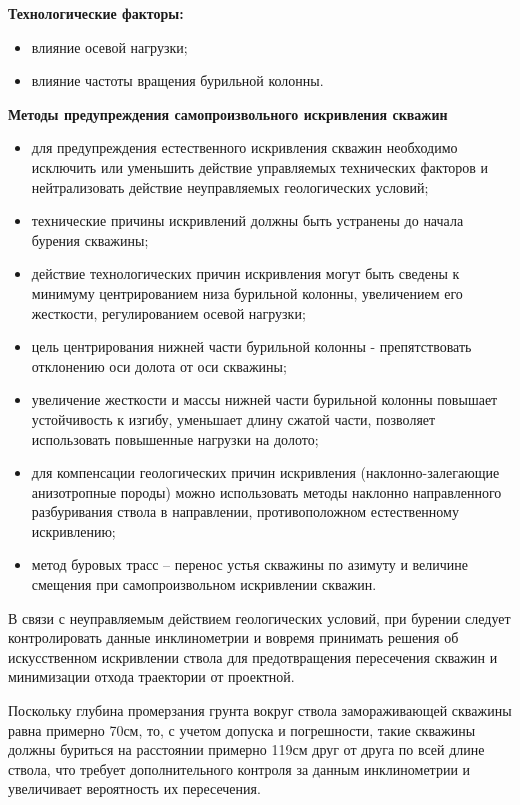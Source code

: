 \textbf{Технологические факторы:}
\begin{itemize}
  \item влияние осевой нагрузки;
  \item влияние частоты вращения бурильной колонны.
\end{itemize}

\textbf{Методы предупреждения самопроизвольного искривления скважин}
\begin{itemize}
  \item для предупреждения естественного искривления скважин необходимо исключить или уменьшить действие управляемых технических факторов и нейтрализовать действие неуправляемых геологических условий;
  \item технические причины искривлений должны быть устранены до начала бурения скважины;
  \item действие технологических причин искривления могут быть сведены к минимуму центрированием низа бурильной колонны, увеличением его жесткости, регулированием осевой нагрузки;
  \item цель центрирования нижней части бурильной колонны - препятствовать отклонению оси долота от оси скважины;
  \item увеличение жесткости и массы нижней части бурильной колонны повышает устойчивость к изгибу, уменьшает длину сжатой части, позволяет использовать повышенные нагрузки на долото;
  \item для компенсации геологических причин искривления (наклонно-залегающие анизотропные породы) можно использовать методы наклонно направленного разбуривания ствола в направлении, противоположном естественному искривлению;
  \item метод буровых трасс – перенос устья скважины по азимуту и величине смещения при самопроизвольном искривлении скважин.
\end{itemize}

В связи с неуправляемым действием геологических условий, при бурении следует контролировать данные инклинометрии и вовремя принимать решения об искусственном искривлении
ствола для предотвращения пересечения скважин и минимизации отхода траектории от проектной.

Поскольку глубина промерзания грунта вокруг ствола замораживающей скважины равна примерно 70см, то, с учетом допуска и погрешности, такие скважины должны буриться
на расстоянии примерно 119см друг от друга по всей длине ствола, что требует дополнительного контроля за данным инклинометрии и увеличивает вероятность их пересечения.

